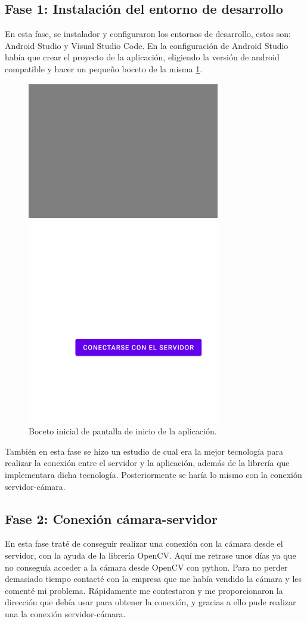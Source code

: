 \subsection{Fase 1: Instalación del entorno de desarrollo}

En esta fase, se instalador y configuraron los entornos de desarrollo, estos son: Android Studio y Visual Studio Code. 
En la configuración de Android Studio había que crear el proyecto de la aplicación, eligiendo la versión de android compatible y hacer un pequeño boceto de la misma \ref{fig:ptimage1}. 
\begin{figure}[h!]
	\centering
	\includegraphics[width=0.35\linewidth]{img/pt1}
	\caption{Boceto inicial de pantalla de inicio de la aplicación.}
	\label{fig:ptimage1}
\end{figure}
También en esta fase se hizo un estudio de cual era la mejor tecnología para realizar la conexión entre el servidor y la aplicación, además de la librería que implementara dicha tecnología.
Posteriormente se haría lo mismo con la conexión servidor-cámara.

\subsection{Fase 2: Conexión cámara-servidor}

En esta fase traté de conseguir realizar una conexión con la cámara desde el servidor, con la ayuda de la librería OpenCV. 
Aquí me retrase unos días ya que no conseguía acceder a la cámara desde OpenCV con python. 
Para no perder demasiado tiempo contacté con la empresa que me había vendido la cámara y les comenté mi problema.
Rápidamente me contestaron y me proporcionaron la dirección que debía usar para obtener la conexión, y gracias a ello pude realizar una la conexión servidor-cámara.

